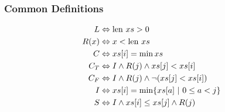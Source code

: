 \begin{lscape}

\label{sec:lit-verification-embedding-example}

\begin{prooftree}





\end{prooftree}

\begin{multicols}{3}
\subsubsection{Common Definitions}
\begin{align*}
  L &\iff \len xs > 0\\
  R(x) &\iff x < \len xs\\
  C &\iff xs[i] = \min xs\\
  C_{T}&\iff I \land R(j) \land xs[j] < xs[i]\\
  C_{F}&\iff I \land R(j) \land \lnot(xs[j] < xs[i])\\
  I&\iff xs[i] = \min \{xs[a]~|~0 \leq a < j\}\\
  S&\iff I \land xs[i] \leq xs[j] \land R(j)
\end{align*}
\vfill


\end{multicols}
\end{lscape}
